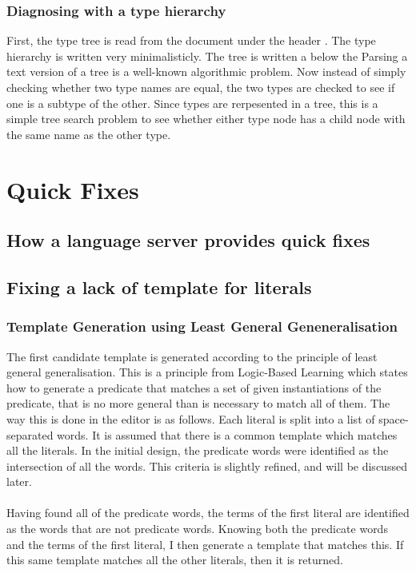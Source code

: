 \documentclass[../main.tex]{subfiles}
\begin{document}
\subsubsection{Diagnosing with a type hierarchy}
First, the type tree is read from the document under the header . The type hierarchy is written very minimalisticly. The tree is written a below the Parsing a text version of a tree is a well-known algorithmic problem.
Now instead of simply checking whether two type names are equal, the two types are checked to see if one is a subtype of the other. Since types are rerpesented in a tree, this is a simple tree search problem to see whether either type node has a child node with the same name as the other type.
%
%
%
\section{Quick Fixes}
\subsection{How a language server provides quick fixes}

\subsection{Fixing a lack of template for literals}
\subsubsection{Template Generation using Least General Geneneralisation}
The first candidate template is generated according to the principle of least general generalisation. This is a principle from Logic-Based Learning which states how to generate a predicate that matches a set of given instantiations of the predicate, that is no more general than is necessary to match all of them.
The way this is done in the editor is as follows. Each literal is split into a list of space-separated words. It is assumed that there is a common template which matches all the literals. In the initial design, the predicate words were identified as the intersection of all the words. This criteria is slightly refined, and will be discussed later.
\\ 
\\
Having found all of the predicate words, the terms of the first literal are identified as the words that are not predicate words. Knowing both the predicate words and the terms of the first literal, I then generate a template that matches this. If this same template matches all the other literals, then it is returned.
\end{document}
